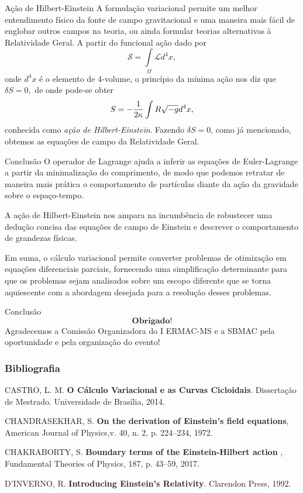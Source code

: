 \documentclass{beamer}
\theoremstyle{plain}
\theoremstyle{definition}
\theoremstyle{definition}
\theoremstyle{definition}
\theoremstyle{definition}
\theoremstyle{definition}
\theoremstyle{definition}
\theoremstyle{definition}
\theoremstyle{definition}
\begin{document}
\begin{frame}{Ação de Hilbert-Einstein}
\justifying
    A formulação variacional permite um melhor entendimento físico da fonte de campo gravitacional e uma maneira mais fácil de englobar outros campos na teoria, ou ainda formular teorias alternativas à Relatividade Geral.
    A partir do funcional ação dado por \[\mathcal{S} = \int\limits_{\Omega} \mathcal{L} d^4 x,\] onde $d^4x$ é o elemento de 4-volume, o princípio da mínima ação nos diz que $\delta S = 0,$ de onde pode-se obter
 \[
 S= - {1 \over 2\kappa}\int R \sqrt{-g} d^4x,
 \]
 conhecida como \textit{ação de Hilbert-Einstein}. Fazendo $\delta S = 0$, como já mencionado, obtemos as equações de campo da Relatividade Geral.
\end{frame}
\begin{frame}{Conclusão}
\justifying
O operador de Lagrange ajuda a inferir as equações de Euler-Lagrange a partir da minimalização do comprimento, de modo que podemos retratar de maneira mais prática o comportamento de partículas diante da ação da gravidade sobre o espaço-tempo.

A ação de Hilbert-Einstein nos ampara na incumbência de robustecer uma dedução concisa das equações de campo de Einstein e descrever o comportamento de grandezas físicas.

Em suma, o cálculo variacional permite converter problemas de otimização em equações diferenciais parciais, fornecendo uma simplificação determinante para que os problemas sejam analisados sobre um escopo diferente que se torna aquiescente com a abordagem desejada para a resolução desses problemas. %

\end{frame}

\begin{frame}{Conclusão}
\[
\textbf{Obrigado!}
\]
\center
 Agradecemos a Comissão Organizadora do I ERMAC-MS e a SBMAC pela oportunidade e pela organização do evento!

\end{frame}


\begin{frame}
\begin{thebibliography}{99} 
\frametitle{Bibliografia}

CASTRO, L. M. {\bf O Cálculo Variacional e as Curvas Cicloidais}. Dissertação de Mestrado. Universidade de Brasília, 2014.

CHANDRASEKHAR, S. {\bf On the derivation of Einstein’s field
equations}, American Journal of Physics,v. 40, n. 2, p. 224–234, 1972.

CHAKRABORTY, S. {\bf Boundary terms of the Einstein-Hilbert action
}, Fundamental Theories of Physics, 187, p. 43–59, 2017.

D'INVERNO, R. {\bf Introducing Einstein's Relativity}. Clarendon Press, 1992.

\end{thebibliography}
\end{frame}
\end{document}
